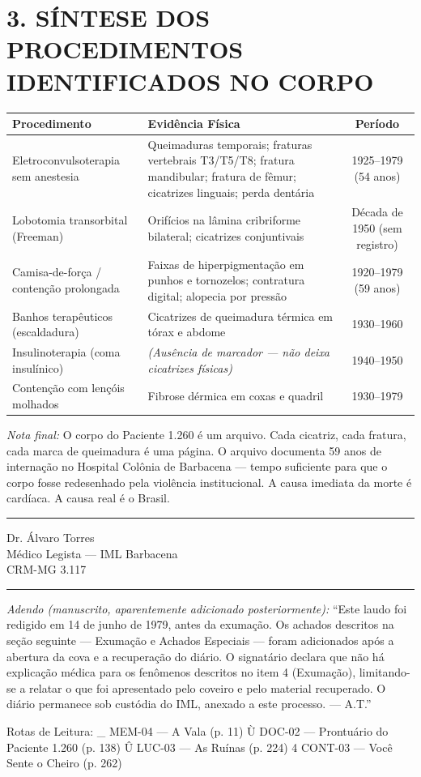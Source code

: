 \vspace{1em}
\section*{3. SÍNTESE DOS PROCEDIMENTOS IDENTIFICADOS NO CORPO}

\vspace{0.5em}

\small
\begin{tabularx}{\textwidth}{|p{3.2cm}|X|c|}
\hline
\textbf{Procedimento} & \textbf{Evidência Física} & \textbf{Período} \\ \hline
Eletroconvulsoterapia sem anestesia & Queimaduras temporais; fraturas vertebrais T3/T5/T8; fratura mandibular; fratura de fêmur; cicatrizes linguais; perda dentária & 1925--1979 (54 anos) \\ \hline
Lobotomia transorbital (Freeman) & Orifícios na lâmina cribriforme bilateral; cicatrizes conjuntivais & Década de 1950 (sem registro) \\ \hline
Camisa-de-força / contenção prolongada & Faixas de hiperpigmentação em punhos e tornozelos; contratura digital; alopecia por pressão & 1920--1979 (59 anos) \\ \hline
Banhos terapêuticos (escaldadura) & Cicatrizes de queimadura térmica em tórax e abdome & 1930--1960 \\ \hline
Insulinoterapia (coma insulínico) & \textit{(Ausência de marcador --- não deixa cicatrizes físicas)} & 1940--1950 \\ \hline
Contenção com lençóis molhados & Fibrose dérmica em coxas e quadril & 1930--1979 \\ \hline
\end{tabularx}
\normalsize

\vspace{1em}
\noindent\textit{Nota final:} O corpo do Paciente 1.260 é um arquivo. Cada cicatriz, cada fratura, cada marca de queimadura é uma página. O arquivo documenta 59 anos de internação no Hospital Colônia de Barbacena --- tempo suficiente para que o corpo fosse redesenhado pela violência institucional. A causa imediata da morte é cardíaca. A causa real é o Brasil.

\vspace{1em}
\hrule
\vspace{0.5em}
\noindent Dr. Álvaro Torres \\
Médico Legista --- IML Barbacena \\
CRM-MG 3.117

\vspace{0.5em}
\hrule
\vspace{0.5em}
\noindent\textit{Adendo (manuscrito, aparentemente adicionado posteriormente):} ``Este laudo foi redigido em 14 de junho de 1979, antes da exumação. Os achados descritos na seção seguinte --- Exumação e Achados Especiais --- foram adicionados após a abertura da cova e a recuperação do diário. O signatário declara que não há explicação médica para os fenômenos descritos no item 4 (Exumação), limitando-se a relatar o que foi apresentado pelo coveiro e pelo material recuperado. O diário permanece sob custódia do IML, anexado a este processo. --- A.T.''

\vfill

Rotas de Leitura:
\_ MEM-04 --- A Vala (p. 11)
Ù DOC-02 --- Prontuário do Paciente 1.260 (p. 138)
Û LUC-03 --- As Ruínas (p. 224)
4 CONT-03 --- Você Sente o Cheiro (p. 262)
